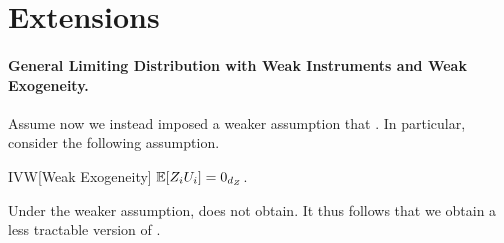 




\section{Extensions}

\label{sec:extensions}


\paragraph*{General Limiting Distribution with Weak Instruments and Weak Exogeneity.}

Assume now we instead imposed a weaker assumption that . In particular, consider the following assumption.
\begin{assumptionp}{IVW}[Weak Exogeneity]\label{ass:weak-exog}
    \(\mathbb{E}[Z_iU_i]=0_{d_Z}\).
\end{assumptionp}


\noindent
Under the weaker assumption,  does not obtain. It thus follows that we obtain a less tractable version of .


